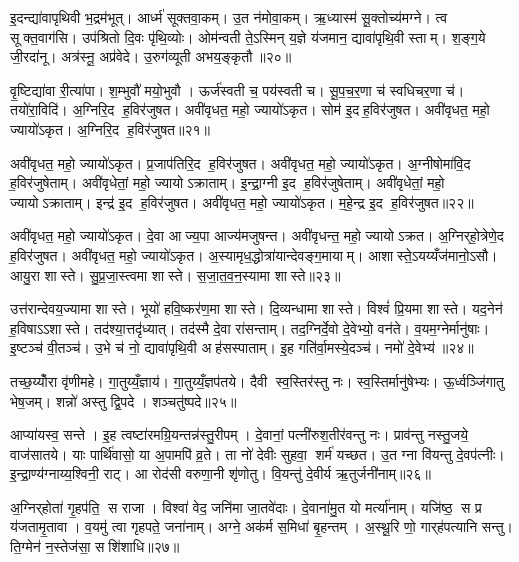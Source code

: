 इ॒दन्द्या॑वापृथिवी भ॒द्रम॑भूत्। आर्ध्म॑ सूक्तवा॒कम्। उ॒त न॑मोवा॒कम्। ऋ॒ध्यास्म॑ सू॒क्तोच्य॑मग्ने। त्व सूक्त॒वाग॑सि। उप॑श्रितो दि॒वः पृ॑थि॒व्योः। ओम॑न्वती ते॒ऽस्मिन् य॒ज्ञे य॑जमान॒ द्यावा॑पृथि॒वी स्ताम्। श॒ङ्ग॒ये जी॒रदा॑नू। अत्र॑स्नू॒ अप्र॑वेदे। उ॒रुग॑व्यूती अभय॒ङ्कृतौ॥२०॥

वृ॒ष्टिद्या॑वा री॒त्या॑पा। श॒म्भुवौ॑ मयो॒भुवौ। ऊर्ज॑स्वती च॒ पय॑स्वती च। सू॒प॒च॒र॒णा च॑ स्वधिचर॒णा च॑। तयो॑रा॒विदि॑। अ॒ग्निरि॒द ह॒विर॑जुषत। अवी॑वृधत॒ महो॒ ज्यायो॑ऽकृत। सोम॑ इ॒दह॒विर॑जुषत। अवी॑वृधत॒ महो॒ ज्यायो॑ऽकृत। अ॒ग्निरि॒द ह॒विर॑जुषत॥२१॥

अवी॑वृधत॒ महो॒ ज्यायो॑ऽकृत। प्र॒जाप॑तिरि॒द ह॒विर॑जुषत। अवी॑वृधत॒ महो॒ ज्यायो॑ऽकृत। अ॒ग्नीषोमा॑वि॒द ह॒विर॑जुषेताम्। अवी॑वृधेतां॒ महो॒ ज्यायोऽक्राताम्। इ॒न्द्रा॒ग्नी इ॒द ह॒विर॑जुषेताम्। अवी॑वृधेतां॒ महो॒ ज्यायोऽक्राताम्। इन्द्र॑ इ॒द ह॒विर॑जुषत। अवी॑वृधत॒ महो॒ ज्यायो॑ऽकृत। म॒हे॒न्द्र इ॒द ह॒विर॑जुषत॥२२॥

अवी॑वृधत॒ महो॒ ज्यायो॑ऽकृत। दे॒वा आज्य॒पा आज्य॑मजुषन्त। अवी॑वृधन्त॒ महो॒ ज्यायोऽक्रत। अ॒ग्निर्‌हो॒त्रेणे॒द ह॒विर॑जुषत। अवी॑वृधत॒ महो॒ ज्यायो॑ऽकृत। अ॒स्यामृध॒द्धोत्रा॑यान्देवङ्ग॒मायाम्। आशास्ते॒ऽयय्यँज॑मानो॒ऽसौ। आयु॒रा शास्ते। सु॒प्र॒जा॒स्त्वमा शास्ते। स॒जा॒त॒व॒न॒स्यामा शास्ते॥२३॥

उत्त॑रान्देवय॒ज्यामा शास्ते। भूयो॑ हवि॒ष्कर॑ण॒मा शास्ते। दि॒व्यन्धामा शास्ते। विश्वं॑ प्रि॒यमा शास्ते। यद॒नेन॑ ह॒विषाऽऽशास्ते। तद॑श्या॒त्तदृ॑ध्यात्। तद॑स्मै दे॒वा रा॑सन्ताम्। तद॒ग्निर्दे॒वो दे॒वेभ्यो॒ वन॑ते। व॒यम॒ग्नेर्मानु॑षाः। इ॒ष्टञ्च॑ वी॒तञ्च॑। उ॒भे च॑ नो॒ द्यावा॑पृथि॒वी अह॑सस्पाताम्। इ॒ह गति॑र्वा॒मस्ये॒दञ्च॑। नमो॑ दे॒वेभ्य॑॥२४॥\anuvakamend[अ॒भ॒य॒ङ्कृता॑वकृता॒ग्निरि॒द ह॒विर॑जुषत महे॒न्द्र इ॒द ह॒विर॑जुषत सजातवन॒स्यामा शास्ते वी॒तञ्च॒ त्रीणि॑ च]

तच्छ॒य्योँरा वृ॑णीमहे। गा॒तुय्यँ॒ज्ञाय॑। गा॒तुय्यँ॒ज्ञप॑तये। दैवी स्व॒स्तिर॑स्तु नः। स्व॒स्तिर्मानु॑षेभ्यः। ऊ॒र्ध्वञ्जि॑गातु भेष॒जम्। शन्नो॑ अस्तु द्वि॒पदे। शञ्चतु॑ष्पदे॥२५॥\anuvakamend[तच्छ॒य्योँर॒ष्टौ]

आप्या॑यस्व॒ सन्ते। इ॒ह त्वष्टा॑रमग्रि॒यन्तन्न॑स्तु॒रीपम्। दे॒वानां॒ पत्नी॑रुश॒तीर॑वन्तु नः। प्राव॑न्तु नस्तु॒जये॒ वाज॑सातये। याः पार्थि॑वासो॒ या अ॒पामपि॑ व्र॒ते। ता नो॑ देवीः सुहवा॒ शर्म॑ यच्छत। उ॒त ग्ना वि॑यन्तु दे॒वप॑त्नीः। इ॒न्द्रा॒ण्य॑ग्नाय्य॒श्विनी॒ राट्। आ रोद॑सी वरुणा॒नी शृ॑णोतु। वि॒यन्तु॑ दे॒वीर्य ऋ॒तुर्जनी॑नाम्॥२६॥

अ॒ग्निर्‌होता॑ गृ॒हप॑ति॒ स राजा। विश्वा॑ वेद॒ जनि॑मा जा॒तवे॑दाः। दे॒वाना॑मु॒त यो मर्त्या॑नाम्। यजि॑ष्ठ॒ स प्र य॑जतामृ॒तावा। व॒यमु॑ त्वा गृहपते॒ जना॑नाम्। अग्ने॒ अक॑र्म स॒मिधा॑ बृ॒हन्तम्। अ॒स्थू॒रि णो॒ गार्‌ह॑पत्यानि सन्तु। ति॒ग्मेन॑ न॒स्तेज॑सा॒ सशि॑शाधि॥२७॥\anuvakamend[जनी॑नाम॒ष्टौ च॑]

